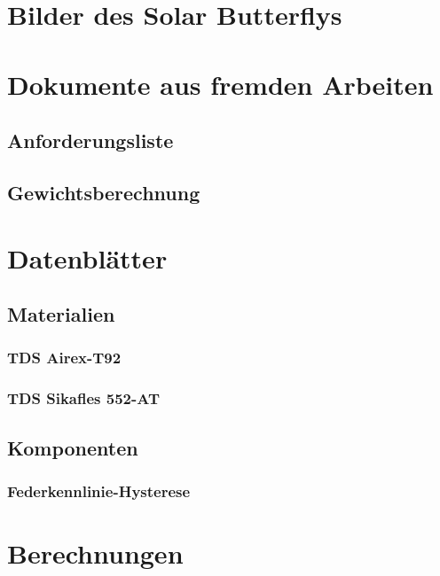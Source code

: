 \section{Bilder des Solar Butterflys}
\label{Bilder des Solar Butterflys}



\section{Dokumente aus fremden Arbeiten}
  \subsection{Anforderungsliste}
  \label{e:Anforderungsliste}
  \subsection{Gewichtsberechnung}
  \label{e:Gewichtsberechnung}




\section{Datenblätter}
  \subsection{Materialien}
  \label{e:Materialien}
    \subsubsection{TDS Airex-T92}
    \label{e:Airex}
    \subsubsection{TDS Sikafles 552-AT}
    \label{e:Sikaflex}

  \subsection{Komponenten}
    \subsubsection{Federkennlinie-Hysterese}
    \label{e:Federkonstante}



\section{Berechnungen}
\label{e:Berechnungen}
